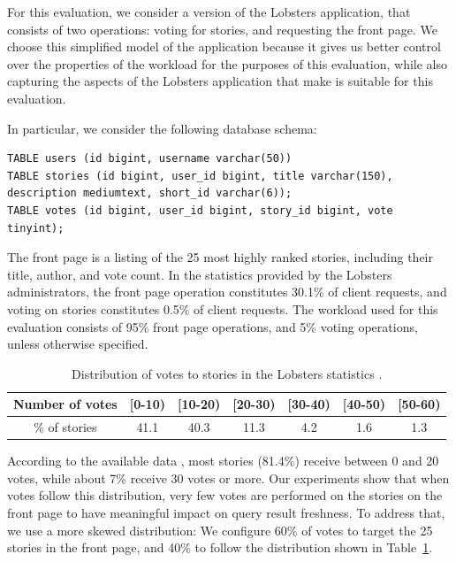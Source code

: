 For this evaluation, we consider a version of the Lobsters application, that consists of two operations:
voting for stories, and requesting the front page.
We choose this simplified model of the application because it gives us better control over the properties of the workload
for the purposes of this evaluation,
while also capturing the aspects of the Lobsters application that make is suitable for this evaluation.

In particular, we consider the following database schema:

\begin{lstlisting}[caption={Simplified Lobsters schema used in this evaluation.}]
TABLE users (id bigint, username varchar(50))
TABLE stories (id bigint, user_id bigint, title varchar(150), description mediumtext, short_id varchar(6));
TABLE votes (id bigint, user_id bigint, story_id bigint, vote tinyint);
\end{lstlisting}

The front page is a listing of the 25 most highly ranked stories, including their title, author, and vote count.
In the statistics provided by the Lobsters administrators, the front page operation constitutes 30.1\% of client requests,
and voting on stories constitutes 0.5\% of client requests.
The workload used for this evaluation consists of 95\% front page operations, and 5\% voting operations, unless otherwise specified.

\begin{table}[H]
\centering
\begin{tabular}{|c||c|c|c|c|c|c|}
\hline
Number of votes & [0-10) & [10-20) & [20-30) & [30-40) & [40-50) & [50-60) \\
\hline
\% of stories & 41.1 & 40.3 & 11.3 & 4.2 & 1.6 & 1.3 \\
\hline
\end{tabular}
\caption{Distribution of votes to stories in the Lobsters statistics \cite{lobste:stats}.}
\label{tab:votes_per_story}
\end{table}

According to the available data \cite{lobste:stats}, most stories (81.4\%) receive between 0 and 20 votes,
while about 7\% receive 30 votes or more.
Our experiments show that when votes follow this distribution,
very few votes are performed on the stories on the front page to have meaningful impact on query result freshness.
To address that, we use a more skewed distribution:
We configure 60\% of votes to target the 25 stories in the front page, and 40\% to follow the distribution shown in Table~\ref{tab:votes_per_story}.

